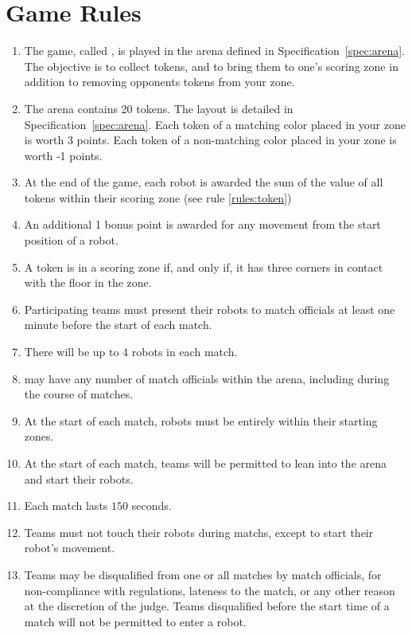 \section{Game Rules}
\label{sec:rules}

\begin{enumerate}
  \item The game, called \emph{\gamename}, is played in the arena defined in
        Specification~\ref{spec:arena}. The objective is to collect tokens, and
        to bring them to one's scoring zone in addition to removing opponents
        tokens from your zone.
  \item The arena contains 20 tokens. The layout is detailed in
        Specification~\ref{spec:arena}. Each token of a matching color placed
        in your zone is worth 3 points. Each token of a non-matching color
        placed in your zone is worth -1 points.
  \item At the end of the game, each robot is awarded the sum of the value of
        all tokens within their scoring zone (see rule \ref{rules:token})
  \item An additional 1 bonus point is awarded for any movement from the
        start position of a robot.
  \item \label{rules:token}A token is in a scoring zone if, and only if, it
        has three corners in contact with the floor in the zone.
  \item Participating teams must present their robots to match officials at
        least one minute before the start of each match.
  \item There will be up to 4 robots in each match.
  \item \org may have any number of match officials within the arena, including
        during the course of matches.
  \item At the start of each match, robots must be entirely within their
        starting zones.
  \item At the start of each match, teams will be permitted to lean into the
        arena and start their robots.
  \item Each match lasts $150$ seconds.
  \item Teams must not touch their robots during matchs, except to start their
        robot's movement.
  \item Teams may be disqualified from one or all matches by match officials,
        for non-compliance with regulations, lateness to the match, or any other
        reason at the discretion of the judge. Teams disqualified before the
        start time of a match will not be permitted to enter a robot.
\end{enumerate}
